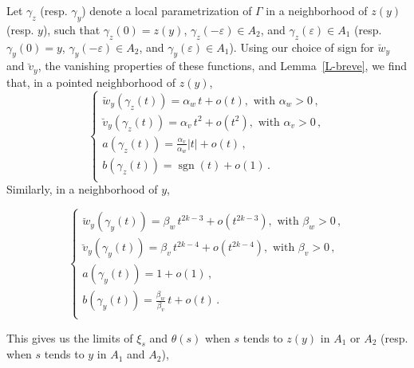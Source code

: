 \documentclass[12pt,a4paper]{amsart}
\theoremstyle{plain} %
\theoremstyle{definition}
\numberwithin{equation}{section}
\numberwithin{figure}{section}
\numberwithin{table}{section}
\DeclareMathOperator{\sign}{sgn}
\begin{document}
Let $\gamma_z$ (resp. $\gamma_y$) denote a local parametrization of $\Gamma $ in a neighborhood of $z(y)$ (resp. $y$), such that $\gamma_z(0) = z(y)$, $\gamma_z(-\varepsilon) \in A_2$, and $\gamma_z(\varepsilon) \in A_1$ (resp. $\gamma_y(0) = y$, $\gamma_y(-\varepsilon) \in A_2$, and $\gamma_y(\varepsilon) \in A_1$). Using our choice of sign for  $\breve{w}_y$ and $\breve{v}_y$, the vanishing properties of these functions, and  Lemma~\ref{L-breve}, we find that, in a  pointed neighborhood of $z(y)$,
%
\begin{equation*}
\left\{
\begin{array}{l}
\breve{w}_y(\gamma_z(t)) = \alpha_w\, t + o(t), {\text{~with~}}\alpha_w > 0\,,\\[5pt]
\breve{v}_y(\gamma_z(t)) = \alpha_v\, t^2 + o(t^2), {\text{~with~}}\alpha_v > 0\,,\\[5pt]
a(\gamma_z(t)) = \frac{\alpha_v}{\alpha_w} |t| + o(t)\,,\\[5pt]
b(\gamma_z(t)) = \sign(t) + o(1)\,.\\[5pt]
\end{array}%
\right.
\end{equation*}
%
Similarly, in a neighborhood of $y$,

\begin{equation*}
\left\{
\begin{array}{l}
\breve{w}_y(\gamma_y(t)) = \beta_w\, t^{2k-3} + o(t^{2k-3}), {\text{~with~}}\beta_w > 0\,,\\[5pt]
\breve{v}_y(\gamma_y(t)) = \beta_v\, t^{2k-4} + o(t^{2k-4}), {\text{~with~}}\beta_v > 0\,,\\[5pt]
a(\gamma_y(t)) =  1 + o(1)\,,\\[5pt]
b(\gamma_y(t)) = \frac{\beta_w}{\beta_v}\, t + o(t)\,.\\[5pt]
\end{array}%
\right.
\end{equation*}

This gives us the limits of $\xi_s$ and $\theta(s)$ when $s$ tends to $z(y)$ in $A_1$ or $A_2$ (resp. when $s$ tends to $y$ in $A_1$ and $A_2$),
\end{document}

